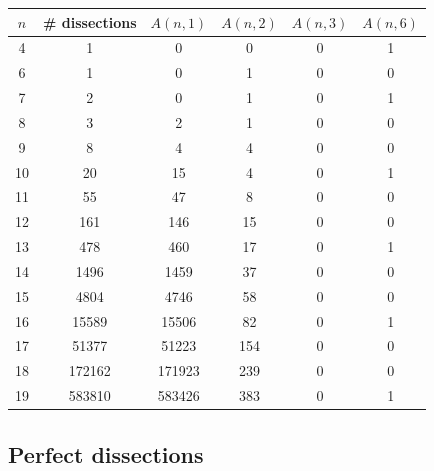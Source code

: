 \documentclass[12pt,amstags,fleqn]{article}
\theoremstyle{plain}
\theoremstyle{definition}
\theoremstyle{definition}
\begin{document}
\begin{center}
\begin{tabular}{|c|c|c|c|c|c|}
\hline $n$ & \# dissections & $A(n,1)$ & $A(n,2)$ & $A(n,3)$ & $A(n,6)$ \\
\hline
\hline 4 & 1 & 0 & 0 & 0 & 1 \\
\hline 6 & 1 & 0 & 1 & 0 & 0 \\
\hline 7 & 2 & 0 & 1 & 0 & 1 \\
\hline 8 & 3 & 2 & 1 & 0 & 0 \\
\hline 9 & 8 & 4 & 4 & 0 & 0 \\
\hline 10 & 20 & 15 & 4 & 0 & 1 \\
\hline 11 & 55 & 47 & 8 & 0 & 0 \\
\hline 12 & 161 & 146 & 15 & 0 & 0 \\
\hline 13 & 478 & 460 & 17 & 0 & 1 \\
\hline 14 & 1496 & 1459 & 37 & 0 & 0 \\
\hline 15 & 4804 & 4746 & 58 & 0 & 0 \\
\hline 16 & 15589 & 15506 & 82 & 0 & 1 \\
\hline 17 & 51377 & 51223 & 154 & 0 & 0 \\
\hline 18 & 172162 & 171923 & 239 & 0 & 0 \\
\hline 19 & 583810 & 583426 & 383 & 0 & 1 \\
\hline
\end{tabular}
\end{center}

\subsection{Perfect dissections}

\end{document}
